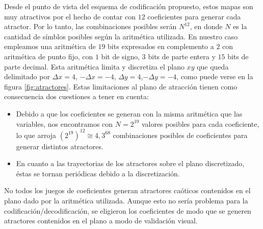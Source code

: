 Desde el punto de vista del esquema de codificación propuesto,
estos mapas son muy atractivos por el hecho de contar con $12$
coeficientes para generar cada atractor. Por lo tanto, las
combinaciones posibles serán $N^{12}$, en donde $N$ es la cantidad
de símblos posibles según la aritmética utilizada. En nuestro caso
empleamos una aritmética de $19$ bits expresados en complemento a
$2$ con aritmética de punto fijo, con $1$ bit de signo, $3$ bits
de parte entera y $15$ bits de parte decimal. Esta aritmética
limita y discretiza el plano $xy$ que queda delimitado por $\Delta
x=4$, $-\Delta x=-4$, $\Delta y=4$,$-\Delta y=-4$, como puede
verse en la figura \ref{fig:atractores}. Estas limitaciones al
plano de atracción tienen como consecuencia dos cuestiones a tener
en cuenta:
\begin{itemize}
    \item
        Debido a que los coeficientes se generan con la misma aritmética que las variables, nos
        encontramos con $N=2^{19}$ valores posibles para cada coeficiente,
        lo que arroja $\left(2^{19}\right)^{12}\cong4,3^{68}$ combinaciones posibles de coeficientes para generar distintos atractores.
    \item
        En cuanto a las trayectorias de los atractores sobre el plano discretizado,
        éstas se tornan periódicas debido a la discretización.
\end{itemize}


No todos los juegos de coeficientes generan atractores caóticos contenidos en el plano dado por la aritmética utilizada. Aunque esto no sería problema para la codificación/decodificación, se eligieron los coeficientes de modo que se generen atractores contenidos en el plano a modo de validación visual.

